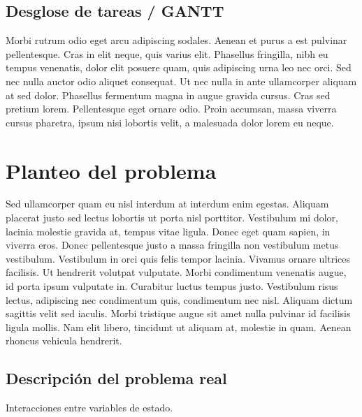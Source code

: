 
\subsection{Desglose de tareas / GANTT}
Morbi rutrum odio eget arcu adipiscing sodales. Aenean et purus a est pulvinar pellentesque. Cras in elit neque, quis varius elit. Phasellus fringilla, nibh eu tempus venenatis, dolor elit posuere quam, quis adipiscing urna leo nec orci. Sed nec nulla auctor odio aliquet consequat. Ut nec nulla in ante ullamcorper aliquam at sed dolor. Phasellus fermentum magna in augue gravida cursus. Cras sed pretium lorem. Pellentesque eget ornare odio. Proin accumsan, massa viverra cursus pharetra, ipsum nisi lobortis velit, a malesuada dolor lorem eu neque.


\section{Planteo del problema}

Sed ullamcorper quam eu nisl interdum at interdum enim egestas. Aliquam placerat justo sed lectus lobortis ut porta nisl porttitor. Vestibulum mi dolor, lacinia molestie gravida at, tempus vitae ligula. Donec eget quam sapien, in viverra eros. Donec pellentesque justo a massa fringilla non vestibulum metus vestibulum. Vestibulum in orci quis felis tempor lacinia. Vivamus ornare ultrices facilisis. Ut hendrerit volutpat vulputate. Morbi condimentum venenatis augue, id porta ipsum vulputate in. Curabitur luctus tempus justo. Vestibulum risus lectus, adipiscing nec condimentum quis, condimentum nec nisl. Aliquam dictum sagittis velit sed iaculis. Morbi tristique augue sit amet nulla pulvinar id facilisis ligula mollis. Nam elit libero, tincidunt ut aliquam at, molestie in quam. Aenean rhoncus vehicula hendrerit.


\subsection{Descripción del problema real}

Interacciones entre variables de estado.

